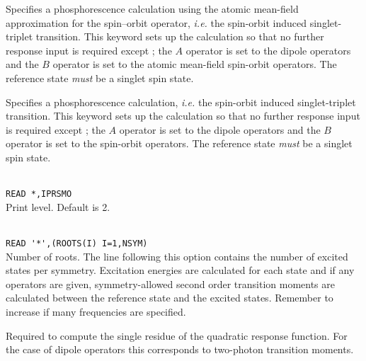 \begin{description}
\item{}
Specifies a phosphorescence calculation using
the atomic mean-field approximation for the spin--orbit operator, {\it i.e.\/}
the spin-orbit 
induced singlet-triplet transition. This keyword sets up the  
calculation so that no further response input is required except ; the
$A$ operator is set to the dipole operators and
the $B$ operator  
is set to the atomic mean-field spin-orbit
operators.
The reference state {\em must} be a singlet spin state.

\item{}
Specifies a phosphorescence calculation, {\it i.e.\/}
the spin-orbit 
induced singlet-triplet transition. This keyword sets up the  
calculation so that no further response input is required except ; the
$A$ operator is set to the dipole operators and
the $B$ operator  
is set to the spin-orbit
operators. \cite{ovhapjhjajthjojcp97,haovbmaqc27} 
The reference state {\em must} be a singlet spin state.

\item{}\\
\verb|READ *,IPRSMO|\\
Print level. Default is 2.

\item{}\\
\verb|READ '*',(ROOTS(I) I=1,NSYM)|\\
Number of roots.  The line following this option contains the number
of excited states per symmetry. Excitation
energies are calculated for each state and if
any operators are given, 
symmetry-allowed second order transition moments are
calculated between the 
reference state and the excited states.
Remember to increase  if many frequencies are specified.

\item{}
Required to
compute the single residue of the quadratic
response function.
For the case of dipole operators this corresponds to two-photon
transition
moments.


\end{description}
